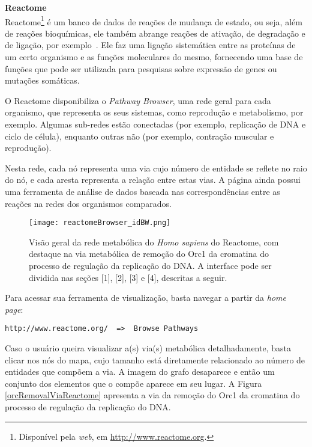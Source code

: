 \textbf{Reactome} \\

\indent Reactome\footnote{Disponível pela \textit{web}, em \url{http://www.reactome.org}.} é um banco de dados de reações de mudança de estado, ou seja, além de reações bioquímicas, ele também abrange reações de ativação, de degradação e de ligação, por exemplo~\cite{reactomeUsersguide}. Ele faz uma ligação sistemática entre as proteínas de um certo organismo e as funções moleculares do mesmo, fornecendo uma base de funções que pode ser utilizada para pesquisas sobre expressão de genes ou mutações somáticas. 

\indent O Reactome disponibiliza o \textit{Pathway Browser}, uma rede geral para cada organismo, que representa os seus sistemas, como reprodução e metabolismo, por exemplo. Algumas sub-redes estão conectadas (por exemplo, replicação de DNA e ciclo de célula), enquanto outras não (por exemplo, contração muscular e reprodução). 

\indent Nesta rede, cada nó representa uma via cujo número de entidade se reflete no raio do nó, e cada aresta representa a relação entre estas vias. A página ainda possui uma ferramenta de análise de dados baseada nas correspondências entre as reações na redes dos organismos comparados.

\begin{figure}[!h]
\centering
\texttt{[image: reactomeBrowser\_idBW.png]}
\caption{Visão geral da rede metabólica do \textit{Homo sapiens} do Reactome, com destaque na via metabólica de remoção do Orc1 da cromatina do processo de regulação da replicação do DNA. A interface pode ser dividida nas seções [1], [2], [3] e [4], descritas a seguir.}
\label{reactomeBrowser_id}
\end{figure}
\indent Para acessar sua ferramenta de visualização, basta navegar a partir da \textit{home page}:

\begin{lstlisting}
http://www.reactome.org/  =>  Browse Pathways
\end{lstlisting}

\indent Caso o usuário queira visualizar a(s) via(s) metabólica detalhadamente, basta clicar nos nós do mapa, cujo tamanho está diretamente relacionado ao número de entidades que compõem a via. A imagem do grafo desaparece e então um conjunto dos elementos que o compõe aparece em seu lugar. A Figura \ref{orcRemovalViaReactome} apresenta a via da remoção do Orc1 da cromatina do processo de regulação da replicação do DNA.

